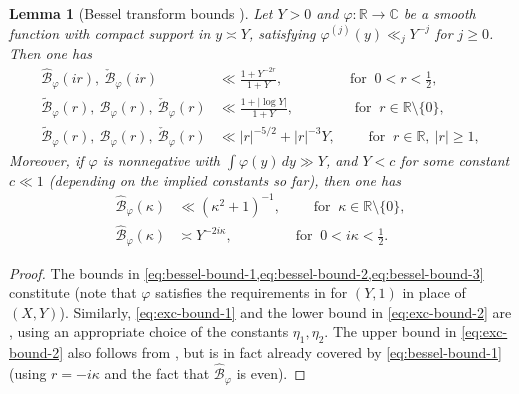\documentclass[reqno,11pt]{amsart}
\newtheorem{knownlemma}[knowntheorem]{Lemma}
\theoremstyle{remark}
\numberwithin{equation}{section}
\newcommand{\R}{\mathbb{R}}
\newcommand{\C}{\mathbb{C}}
\newcommand{\mB}{\mathcal{B}}
\renewcommand{\hat}{\widehat}
\renewcommand{\tilde}{\widetilde}
\begin{document}
\begin{knownlemma}[Bessel transform bounds \cite{deshouillers1982kloosterman}] \label{lem:bessel-bounds}
Let $Y > 0$ and $\varphi : \R \to \C$ be a smooth function with compact support in $y \asymp Y$, satisfying $\varphi^{(j)}(y) \ll_j Y^{-j}$ for $j \ge 0$. Then one has
\begin{align}
    \hat{\mB}_\varphi(ir),\ \check{\mB}_{\varphi}(ir) 
    &\ll 
    \frac{1 + Y^{-2r}}{1+Y}, \qquad\qquad\ \   \text{ for }\ 0 < r < \frac{1}{2},
    \label{eq:bessel-bound-1}
    \\
    \tilde{\mB}_\varphi(r),\ \hat{\mB}_\varphi(r),\ \check{\mB}_{\varphi}(r) 
    &\ll 
    \frac{1 + |\log Y|}{1+Y}, \qquad\qquad \text{ for }\ r \in \R \setminus \{0\},
    \label{eq:bessel-bound-2}
    \\
    \tilde{\mB}_\varphi(r),\ \hat{\mB}_\varphi(r),\ \check{\mB}_{\varphi}(r) 
    &\ll 
    |r|^{-5/2} + |r|^{-3}Y, \qquad \text{ for }\ r \in \R,\ |r| \ge 1,
    \label{eq:bessel-bound-3}
\end{align}
Moreover, if $\varphi$ is nonnegative with $\int \varphi(y)\, dy \gg Y$, and $Y < c$ for some constant $c \ll 1$ (depending on the implied constants so far), then one has
\begin{align} 
    \hat{\mB}_\varphi(\kappa) &\ll (\kappa^2+1)^{-1},
    \qquad  
    \text{ for }\ \kappa \in \R \setminus \{0\},
    \label{eq:exc-bound-1}
    \\
    \hat{\mB}_\varphi(\kappa) &\asymp Y^{-2i\kappa}, 
    \qquad\qquad \, 
    \text{ for }\ 0 < i \kappa < \frac{1}{2}.
    \label{eq:exc-bound-2}
\end{align}
\end{knownlemma}
\begin{proof}
The bounds in \cref{eq:bessel-bound-1,eq:bessel-bound-2,eq:bessel-bound-3} constitute \cite[Lemma 7.1]{deshouillers1982kloosterman} (note that $\varphi$ satisfies the requirements in \cite[(1.43) and (1.44)]{deshouillers1982kloosterman} for $(Y, 1)$ in place of $(X, Y)$). Similarly, \cref{eq:exc-bound-1} and the lower bound in \cref{eq:exc-bound-2} are \cite[(8.2) and (8.3), following from (8.1)]{deshouillers1982kloosterman}, using an appropriate choice of the constants $\eta_1, \eta_2$. The upper bound in \cref{eq:exc-bound-2} also follows from \cite[(8.1)]{deshouillers1982kloosterman}, but is in fact already covered by \cref{eq:bessel-bound-1} (using $r = -i\kappa$ and the fact that $\hat{\mB}_\varphi$ is even).
\end{proof}
\end{document}
